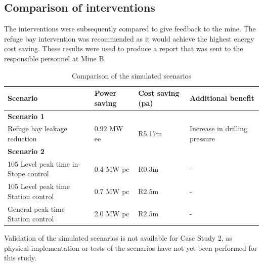 	\subsection{Comparison of interventions}
	The interventions were subsequently compared to give feedback to the mine. The refuge bay intervention was recommended as it would achieve the highest energy cost saving. These results were used to produce a report that was sent to the responsible personnel at Mine B.
	\\
	\begin{table}[h!]
		\caption{Comparison of the simulated scenarios}
		\centering
		\begin{tabular}{p{}
				p{}
				p{}
				p{}}
			\hline 
			 \vspace{0.5em}Scenario & \vspace{0.5em}Power saving & Cost saving (\gls{pa}) & \vspace{0.5em}Additional benefit \\
			\hline
			\multicolumn{4}{l}{\textbf{Scenario 1}} \\
			Refuge bay leakage reduction & $ 0.92 $ MW \gls{ee} & R5.17m & Increase in drilling pressure \\
			 
			\multicolumn{4}{l}{\textbf{Scenario 2}} \\
			105 Level peak time in-Stope control & $ 0.4 $ MW \gls{pc} & R$ 0.3 $m& - \\
			105 Level peak time Station control & $ 0.7 $ MW \gls{pc} & R$ 2.5 $m& - \\
			General peak time Station control & $ 2.0 $ MW \gls{pc} & R$ 2.5 $m& - \\
			\hline 
		\end{tabular}
		\label{Table: B Comparison}
	\end{table}
\par
Validation of the simulated scenarios is not available for Case Study 2, as physical implementation or tests of the scenarios have not yet been performed for this study.

